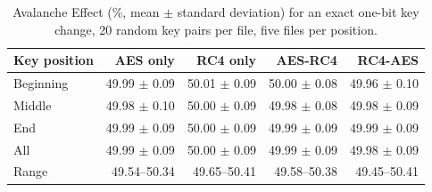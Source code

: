 \begin{table}[htbp]
\centering
\caption{Avalanche Effect (\%, mean $\pm$ standard deviation) for an exact one-bit key change, 20 random key pairs per file, five files per position.}
\label{tab:p3_ae_strict}
\small
\begin{tabular}{lrrrr}
\toprule
\textbf{Key position} & \textbf{AES only} & \textbf{RC4 only} & \textbf{AES-RC4} & \textbf{RC4-AES} \\
\midrule
Beginning & 49.99 $\pm$ 0.09 & 50.01 $\pm$ 0.09 & 50.00 $\pm$ 0.08 & 49.96 $\pm$ 0.10 \\
Middle & 49.98 $\pm$ 0.10 & 50.00 $\pm$ 0.09 & 49.98 $\pm$ 0.08 & 49.98 $\pm$ 0.09 \\
End & 49.99 $\pm$ 0.09 & 50.00 $\pm$ 0.09 & 49.99 $\pm$ 0.09 & 49.99 $\pm$ 0.09 \\
\midrule
All & 49.99 $\pm$ 0.09 & 50.00 $\pm$ 0.09 & 49.99 $\pm$ 0.09 & 49.98 $\pm$ 0.09 \\
Range & 49.54--50.34 & 49.65--50.41 & 49.58--50.38 & 49.45--50.41 \\
\bottomrule
\end{tabular}
\end{table}

